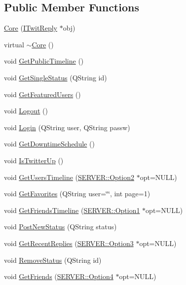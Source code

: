 \subsection*{Public Member Functions}
\begin{CompactItemize}
\item 
\hyperlink{classCore_4d99e39664e6f9a1b885742f92d83ade}{Core} (\hyperlink{classITwitReply}{ITwitReply} $\ast$obj)
\item 
virtual \hyperlink{classCore_776f8c46504b14183883c6273f93eaed}{$\sim$Core} ()
\item 
void \hyperlink{classCore_e07b32f495c64e768eb74cf50585352c}{GetPublicTimeline} ()
\item 
void \hyperlink{classCore_88d775139d0168f3fa24b4b4fda83386}{GetSingleStatus} (QString id)
\item 
void \hyperlink{classCore_c5f77029d34a1427c6b8a491c646e80b}{GetFeaturedUsers} ()
\item 
void \hyperlink{classCore_e4ec033e04b6490ac08d6f07507bc9c2}{Logout} ()
\item 
void \hyperlink{classCore_4570f9ad07c0ba58ce6326eb76568bf6}{Login} (QString user, QString passw)
\item 
void \hyperlink{classCore_7ba2a526280dcfc427480956f90f29cb}{GetDowntimeSchedule} ()
\item 
void \hyperlink{classCore_eeaa4a9429ac0a0dd2c2d11c0c0eea81}{IsTwitterUp} ()
\item 
void \hyperlink{classCore_7308eb02f04bd6da071db62f291c9def}{GetUsersTimeline} (\hyperlink{structSERVER_1_1Option2}{SERVER::Option2} $\ast$opt=NULL)
\item 
void \hyperlink{classCore_a896aea28b564e4841df4cf527fb0247}{GetFavorites} (QString user=\char`\"{}\char`\"{}, int page=1)
\item 
void \hyperlink{classCore_bc64aa3de63d39a878db543d8d5df9f5}{GetFriendsTimeline} (\hyperlink{structSERVER_1_1Option1}{SERVER::Option1} $\ast$opt=NULL)
\item 
void \hyperlink{classCore_7023af805b629e90a7aa2978366ee344}{PostNewStatus} (QString status)
\item 
void \hyperlink{classCore_b95dc3fca63c84496f6a487d845e7ba9}{GetRecentReplies} (\hyperlink{structSERVER_1_1Option3}{SERVER::Option3} $\ast$opt=NULL)
\item 
void \hyperlink{classCore_d881d4987b2845589443f74fb81da766}{RemoveStatus} (QString id)
\item 
void \hyperlink{classCore_2d41bfdcb5a2dff232ee299e83a7c8e6}{GetFriends} (\hyperlink{structSERVER_1_1Option4}{SERVER::Option4} $\ast$opt=NULL)

\end{CompactItemize}
